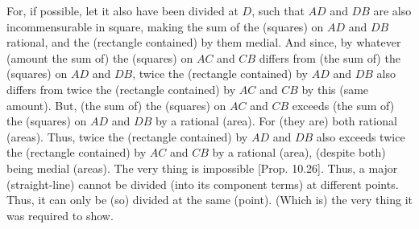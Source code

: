 \begin{Parallel}{}{}
{For, if possible, let it also have been divided at $D$, such that $AD$ and
$DB$ are also incommensurable in square, making the
sum of the (squares) on $AD$ and $DB$ rational, and the (rectangle contained) by them medial. And since, by whatever (amount the sum of)
the (squares) on $AC$ and $CB$ differs from (the sum of) the (squares)
on $AD$ and $DB$, 
twice the (rectangle contained) by $AD$ and $DB$ also differs from
twice the (rectangle contained) by $AC$ and $CB$ by this (same amount). But, (the sum of) the
(squares) on $AC$ and $CB$ exceeds (the sum of) the (squares) on
$AD$ and $DB$ by a rational (area). For (they are) both rational (areas). Thus, twice the
(rectangle contained) by $AD$ and $DB$ also exceeds twice the
(rectangle contained) by $AC$ and $CB$ by a rational (area), (despite both) being medial (areas).
The very thing is impossible [Prop. 10.26].
Thus, a major (straight-line) cannot be divided (into its component terms) at different points. Thus,
it can only be (so) divided at the same (point). (Which is) the very thing it was required to show.}
\end{Parallel}



